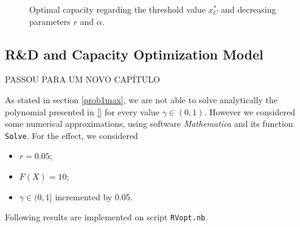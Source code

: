 \begin{figure}[!htb]
	\begin{subfigmatrix}{2}
	\end{subfigmatrix}
	\caption{Optimal capacity regarding the threshold value $x^*_C$ and decreasing parameters $r$ and $\alpha$.}
	\label{fig:k2}
\end{figure}









\subsection{R\&D and Capacity Optimization Model}
\label{subsec:RDcap1}

PASSOU PARA UM NOVO CAPÍTULO

As stated in section \ref{prob1max}, we are not able to solve analytically the polynomial presented in \eqref{} for every value $\gamma \in (0,1)$. However we considered some numerical approximations, using software \textit{Mathematica} and its function \texttt{Solve}. For the effect, we considered 
\begin{itemize}
	\item $r=0.05$;
	\item $F(X)=10$;
	\item $\gamma \in (0,1]$ incremented by 0.05.
\end{itemize}

Following results are implemented on script \texttt{RVopt.nb}.


